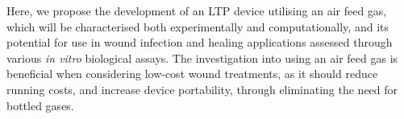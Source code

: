 \documentclass[11pt, oneside]{article}   	%
\begin{document}
Here, we propose the development of an LTP device utilising an air feed gas, which will be characterised both experimentally and computationally, and its potential for use in wound infection and healing applications assessed through various \textit{in vitro} biological assays.
The investigation into using an air feed gas is beneficial when considering low-cost wound treatments, as it should reduce running costs, and increase device portability, through eliminating the need for bottled gases.


%
\end{document}
